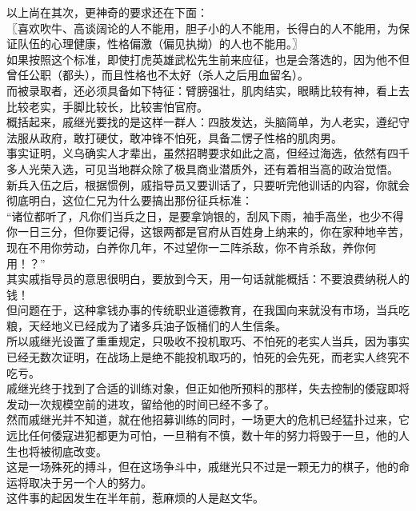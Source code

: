 \begin{multicols}{\theparacolNo}
以上尚在其次，更神奇的要求还在下面：\\

〖喜欢吹牛、高谈阔论的人不能用，胆子小的人不能用，长得白的人不能用，为保证队伍的心理健康，性格偏激（偏见执拗）的人也不能用。〗\\

如果按照这个标准，即使打虎英雄武松先生前来应征，也是会落选的，因为他不但曾任公职（都头），而且性格也不太好（杀人之后用血留名）。\\

而被录取者，还必须具备如下特征：臂膀强壮，肌肉结实，眼睛比较有神，看上去比较老实，手脚比较长，比较害怕官府。\\

概括起来，戚继光要找的是这样一群人：四肢发达，头脑简单，为人老实，遵纪守法服从政府，敢打硬仗，敢冲锋不怕死，具备二愣子性格的肌肉男。\\

事实证明，义乌确实人才辈出，虽然招聘要求如此之高，但经过海选，依然有四千多人光荣入选，可见当地群众除了极具商业潜质外，还有着相当高的政治觉悟。\\

新兵入伍之后，根据惯例，戚指导员又要训话了，只要听完他训话的内容，你就会彻底明白，这位仁兄为什么要搞出那份征兵标准：\\

“诸位都听了，凡你们当兵之日，是要拿饷银的，刮风下雨，袖手高坐，也少不得你一日三分，但你要记得，这银两都是官府从百姓身上纳来的，你在家种地辛苦，现在不用你劳动，白养你几年，不过望你一二阵杀敌，你不肯杀敌，养你何用！？”\\

其实戚指导员的意思很明白，要放到今天，用一句话就能概括：不要浪费纳税人的钱！\\

但问题在于，这种拿钱办事的传统职业道德教育，在我国向来就没有市场，当兵吃粮，天经地义已经成为了诸多兵油子饭桶们的人生信条。\\

所以戚继光设置了重重规定，只吸收不投机取巧、不怕死的老实人当兵，因为事实已经无数次证明，在战场上是绝不能投机取巧的，怕死的会先死，而老实人终究不吃亏。\\

戚继光终于找到了合适的训练对象，但正如他所预料的那样，失去控制的倭寇即将发动一次规模空前的进攻，留给他的时间已经不多了。\\

然而戚继光并不知道，就在他招募训练的同时，一场更大的危机已经猛扑过来，它远比任何倭寇进犯都更为可怕，一旦稍有不慎，数十年的努力将毁于一旦，他的人生也将被彻底改变。\\

这是一场殊死的搏斗，但在这场争斗中，戚继光只不过是一颗无力的棋子，他的命运将取决于另一个人的努力。\\

这件事的起因发生在半年前，惹麻烦的人是赵文华。\\
\ifnum{}
	\end{multicols}
\fi
\newpage
